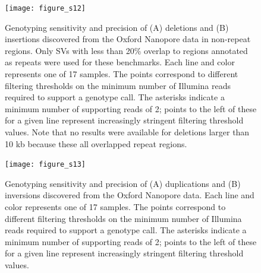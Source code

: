 \documentclass[12pt]{article}
\newenvironment{cfigure}
	{\begin{figure} \centering}
	{\end{figure}}
\newenvironment{lsfigure}
	{\begin{landscape} \begin{figure} \centering}
	{\end{figure} \end{landscape}}
\begin{document}
\clearpage%

\begin{lsfigure}
		\texttt{[image: figure\_s12]}

		\caption[Sensitivity and precision of Oxford Nanopore deletion and insertion genotyping in non-repeat regions]{
			Genotyping sensitivity and precision of (A) deletions and (B) insertions discovered from the Oxford Nanopore data in non-repeat regions. 
			Only SVs with less than 20\% overlap to regions annotated as repeats were used for these benchmarks. 
			Each line and color represents one of 17 samples. 
		The points correspond to different filtering thresholds on the minimum number of Illumina reads required to support a genotype call.
			The asterisks indicate a minimum number of supporting reads of 2; points to the left of these for a given line represent increasingly stringent filtering threshold values.
			Note that no results were available for deletions larger than 10 kb because these all overlapped repeat regions.
	}

		\label{fig_s12}
\end{lsfigure}

\clearpage%

\begin{cfigure}
	\texttt{[image: figure\_s13]}

	\caption[Sensitivity and precision of Oxford Nanopore duplication and inversion genotyping]{
		Genotyping sensitivity and precision of (A) duplications and (B) inversions discovered from the Oxford Nanopore data. 
		Each line and color represents one of 17 samples. 
		The points correspond to different filtering thresholds on the minimum number of Illumina reads required to support a genotype call.
		The asterisks indicate a minimum number of supporting reads of 2; points to the left of these for a given line represent increasingly stringent filtering threshold values.
	}

	\label{fig_s13}

\end{cfigure}

\clearpage%
\end{document}
